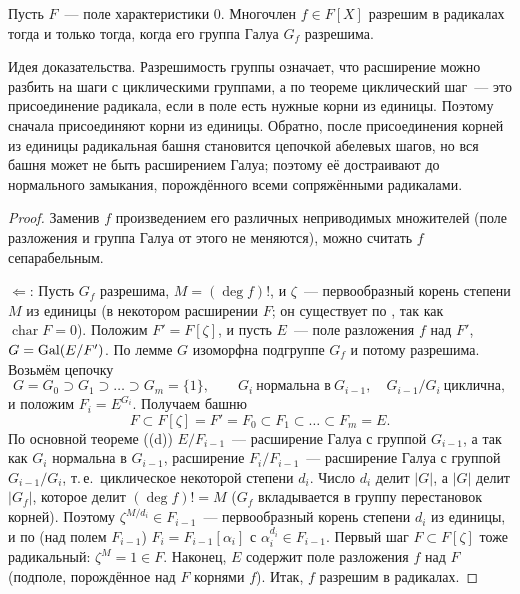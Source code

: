 \begin{theorem}[5.34]
Пусть $F$~--- поле характеристики $0$. Многочлен $f\in F[X]$ разрешим в радикалах тогда и только тогда, когда его группа
Галуа $G_f$ разрешима.
\end{theorem}

Идея доказательства. Разрешимость группы означает, что расширение можно разбить на шаги с циклическими группами, а по
теореме  циклический шаг~--- это присоединение радикала, если в поле есть нужные корни из единицы. Поэтому сначала
присоединяют корни из единицы. Обратно, после присоединения корней из единицы радикальная башня становится цепочкой
абелевых шагов, но вся башня может не быть расширением Галуа; поэтому её достраивают до нормального замыкания,
порождённого всеми сопряжёнными радикалами.

\begin{proof}
Заменив $f$ произведением его различных неприводимых множителей (поле разложения и группа Галуа от этого не
меняются), можно считать $f$ сепарабельным.

$\Leftarrow$: Пусть $G_f$ разрешима, $M=(\deg f)!$, и $\zeta$~--- первообразный корень степени $M$ из единицы (в
некотором расширении $F$; он существует по , так как $\operatorname{char}F=0$). Положим $F'=F[\zeta]$, и пусть $E$~---
поле разложения $f$ над $F'$, $G=\operatorname{Gal}(E/F')$. По лемме  $G$ изоморфна подгруппе $G_f$ и потому разрешима. Возьмём
цепочку
\[
G=G_0\supset G_1\supset\dots\supset G_m=\{1\},\qquad G_i\ \text{нормальна в}\ G_{i-1},\quad G_{i-1}/G_i\ \text{циклична},
\]
и положим $F_i=E^{G_i}$. Получаем башню
\[
F\subset F[\zeta]=F'=F_0\subset F_1\subset\dots\subset F_m=E.
\]
По основной теореме ((d)) $E/F_{i-1}$~--- расширение Галуа с группой $G_{i-1}$, а так как $G_i$ нормальна в $G_{i-1}$,
расширение $F_i/F_{i-1}$~--- расширение Галуа с группой $G_{i-1}/G_i$, т.\,е.\ циклическое некоторой степени $d_i$. Число $d_i$
делит $|G|$, а $|G|$ делит $|G_f|$, которое делит $(\deg f)!=M$ ($G_f$ вкладывается в группу перестановок корней). Поэтому
$\zeta^{M/d_i}\in F_{i-1}$~--- первообразный корень степени $d_i$ из единицы, и по  (над полем $F_{i-1}$)
$F_i=F_{i-1}[\alpha_i]$ с $\alpha_i^{d_i}\in F_{i-1}$. Первый шаг $F\subset F[\zeta]$ тоже радикальный: $\zeta^M=1\in F$. Наконец,
$E$ содержит поле разложения $f$ над $F$ (подполе, порождённое над $F$ корнями $f$). Итак, $f$ разрешим в радикалах.


\end{proof}
